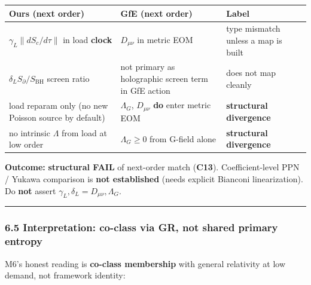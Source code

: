 \documentclass[
  11pt,
]{article}
\newcounter{none} %
\begin{document}
{\def\LTcaptype{none} %
\begin{longtable}[]{@{}
  >{\raggedright\arraybackslash}p{}
  >{\raggedright\arraybackslash}p{}
  >{\raggedright\arraybackslash}p{}@{}}
\toprule\noalign{}
\begin{minipage}[b]{\linewidth}\raggedright
Ours (next order)
\end{minipage} & \begin{minipage}[b]{\linewidth}\raggedright
GfE (next order)
\end{minipage} & \begin{minipage}[b]{\linewidth}\raggedright
Label
\end{minipage} \\
\midrule\noalign{}
\endhead
\bottomrule\noalign{}
\endlastfoot
\(\gamma_L\|dS_c/d\tau\|\) in load \textbf{clock} & \(D_{\mu\nu}\) in
metric EOM & type mismatch unless a map is built \\
\(\delta_L S_{\partial}/S_{\mathrm{BH}}\) screen ratio & not primary as
holographic screen term in GfE action & does not map cleanly \\
load reparam only (no new Poisson source by default) & \(\Lambda_G\),
\(D_{\mu\nu}\) \textbf{do} enter metric EOM & \textbf{structural
divergence} \\
no intrinsic \(\Lambda\) from load at low order & \(\Lambda_G\ge 0\)
from G-field alone & \textbf{structural divergence} \\
\end{longtable}
}

\textbf{Outcome:} \textbf{structural FAIL} of next-order match
(\textbf{C13}). Coefficient-level PPN / Yukawa comparison is \textbf{not
established} (needs explicit Bianconi linearization). Do \textbf{not}
assert \(\gamma_L,\delta_L=D_{\mu\nu},\Lambda_G\).

\begin{center}\rule{0.5\linewidth}{0.5pt}\end{center}

\subsubsection{6.5 Interpretation: co-class via GR, not shared primary
entropy}\label{interpretation-co-class-via-gr-not-shared-primary-entropy}

M6's honest reading is \textbf{co-class membership} with general
relativity at low demand, not framework identity:
\end{document}
